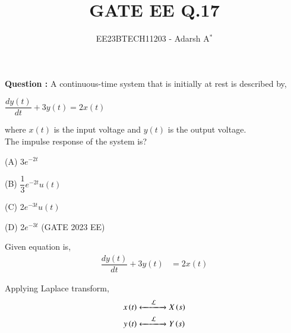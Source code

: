\documentclass[journal,12pt,onecolumn]{IEEEtran}
\theoremstyle{remark}
\begin{document}
	
	
	\vspace{3cm}
	
	\title{GATE EE Q.17}
	\author{EE23BTECH11203 - Adarsh A$^{*}$%
	}
	\maketitle
	\bigskip
	
	\renewcommand{\thefigure}{\theenumi}
	\renewcommand{\thetable}{\theenumi}
	
	
	\vspace{0.2cm}
	\linespread{1.1}
	
	
	\textbf{ Question : }
	 A continuous-time system that is initially at rest is described by,
	\begin{center}
		$\dfrac{dy(t)}{dt} + 3y(t) = 2x(t)$
	\end{center}
	where $x(t)$ is the input voltage and $y(t)$ is the output voltage.\\ 
	The impulse response of the system is?
	
	\vspace{0.2cm}
	
	(A) 3$e^{-2t}$
	
	\vspace{0.3cm}
	
	(B) $\dfrac{1}{3}e^{-2t} u(t)$
	
	\vspace{0.3cm}
	
	(C) 2$e^{-3t} u(t)$
	
	\vspace{0.2cm}
	
	(D) 2$e^{-3t}$ \hfill(GATE 2023 EE)
	
	\vspace{0.2cm}
	
	\solution
	
	
	\fi
	
	Given equation is,
	\begin{align}
		\dfrac{dy(t)}{dt} + 3y(t) &= 2x(t)
	\end{align}
	
	Applying Laplace transform,
	\begin{align}
		x\left(t\right) &
		\xleftarrow[]{\hspace{0.4cm}{\mathcal{L}}\hspace{0.1cm}}\xrightarrow[]{}
		X\left(s\right)\\
		y\left(t\right) &
		\xleftarrow[]{\hspace{0.4cm}{\mathcal{L}}\hspace{0.1cm}}\xrightarrow[]{}
		Y\left(s\right)
	\end{align}
	
\end{document}
